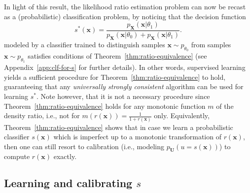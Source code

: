 \documentclass[12pt]{article}
\numberwithin{equation}{section}
\theoremstyle{plain}
\begin{document}

In light of this result, the likelihood ratio estimation problem can now
be recast as a (probabilistic) classification problem, by noticing that the decision
function
\begin{equation}\label{eqn:best-s-clf}
s^*(\mathbf{x}) = \frac{p_{\mathbf{X}}(\mathbf{x}|\theta_1)}{p_{\mathbf{X}}(\mathbf{x} | \theta_0) + p_{\mathbf{X}}(\mathbf{x} | \theta_1)}.
\end{equation}
modeled by a classifier trained to distinguish samples $\mathbf{x} \sim p_{\theta_0}$
from samples $\mathbf{x} \sim p_{\theta_1}$ satisfies conditions of
Theorem~\ref{thm:ratio-equivalence} (see Appendix~\ref{app:clf-for-s} for further details).
In other words, supervised learning yields a sufficient
procedure for Theorem~\ref{thm:ratio-equivalence} to hold, guaranteeing that any
{\it universally strongly consistent} algorithm can be used for learning $s^*$.
Note however, that it is not a necessary procedure since
Theorem~\ref{thm:ratio-equivalence} holds for any monotonic function $m$ of the
density ratio, i.e., not for $m(r(\mathbf{x})) = \frac{1}{1 +
r(\mathbf{x})}$ only.
Equivalently,
Theorem~\ref{thm:ratio-equivalence} shows that in case we learn a probabilistic
classifier $s(\mathbf{x})$ which is imperfect up to a monotonic transformation
of $r(\mathbf{x})$, then one can still resort to calibration (i.e., modeling
$p_{\mathbf{U}}(u=s(\mathbf{x}))$) to compute $r(\mathbf{x})$ exactly.


\subsection{Learning and calibrating $s$}
\end{document}
